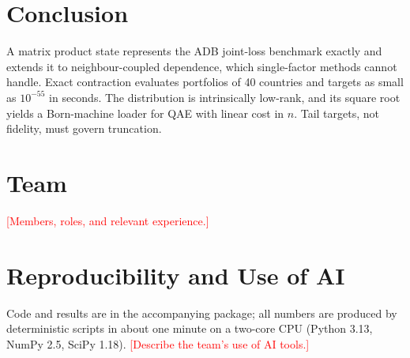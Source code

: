 \documentclass[conference]{IEEEtran}
\newcommand{\todo}[1]{\textcolor{red}{[#1]}}
\begin{document}
\section{Conclusion}
A matrix product state represents the ADB joint-loss benchmark exactly and extends it to neighbour-coupled
dependence, which single-factor methods cannot handle. Exact contraction evaluates portfolios of 40 countries and
targets as small as $10^{-55}$ in seconds. The distribution is intrinsically low-rank, and its square root yields a
Born-machine loader for QAE with linear cost in $n$. Tail targets, not fidelity, must govern truncation.

\section*{Team}
\todo{Members, roles, and relevant experience.}

\section*{Reproducibility and Use of AI}
Code and results are in the accompanying package; all numbers are produced by deterministic scripts in about one
minute on a two-core CPU (Python 3.13, NumPy 2.5, SciPy 1.18). \todo{Describe the team's use of AI tools.}
\end{document}
